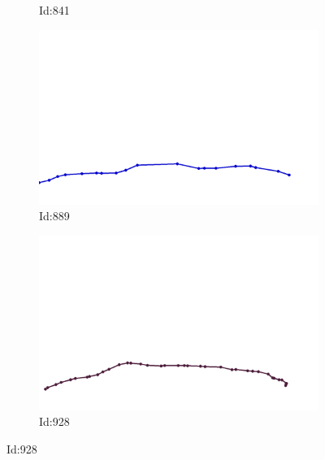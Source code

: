 \documentclass[12pt,twoside]{report}
\begin{document}
\begin{figure}
\begin{subfigure}[b]{0.20\textwidth}
\caption{Id:841}
\end{subfigure}
\begin{subfigure}[b]{0.20\textwidth}
\centering
\includegraphics[width=\textwidth]{../../trajectories/889.png}
\caption{Id:889}
\end{subfigure}
\begin{subfigure}[b]{0.20\textwidth}
\centering
\includegraphics[width=\textwidth]{../../trajectories/928.png}
\caption{Id:928}
\end{subfigure}
\end{figure}
\end{document}
